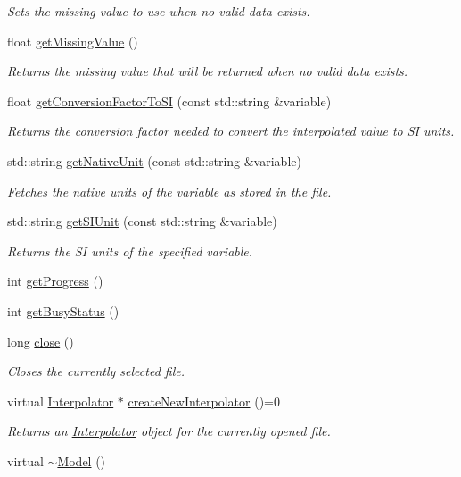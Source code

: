 \begin{DoxyCompactItemize}
\begin{DoxyCompactList}\small\item\em Sets the missing value to use when no valid data exists. \end{DoxyCompactList}\item 
float \hyperlink{classccmc_1_1_model_aaf909e4165fadb7e6676b49b24df5395}{get\-Missing\-Value} ()
\begin{DoxyCompactList}\small\item\em Returns the missing value that will be returned when no valid data exists. \end{DoxyCompactList}\item 
float \hyperlink{classccmc_1_1_model_a360b4e5af01c3e06e6673bcbd3a45866}{get\-Conversion\-Factor\-To\-S\-I} (const std\-::string \&variable)
\begin{DoxyCompactList}\small\item\em Returns the conversion factor needed to convert the interpolated value to S\-I units. \end{DoxyCompactList}\item 
std\-::string \hyperlink{classccmc_1_1_model_adca33e777f077a8b8e8ad0a55b6522a2}{get\-Native\-Unit} (const std\-::string \&variable)
\begin{DoxyCompactList}\small\item\em Fetches the native units of the variable as stored in the file. \end{DoxyCompactList}\item 
std\-::string \hyperlink{classccmc_1_1_model_ad854953817fe933b40bc101ffd585270}{get\-S\-I\-Unit} (const std\-::string \&variable)
\begin{DoxyCompactList}\small\item\em Returns the S\-I units of the specified variable. \end{DoxyCompactList}\item 
int \hyperlink{classccmc_1_1_model_acefd918ab6e100f78db9321e0e9d52d1}{get\-Progress} ()
\item 
int \hyperlink{classccmc_1_1_model_a6447808cc040178db855bede2fbd1e57}{get\-Busy\-Status} ()
\item 
long \hyperlink{classccmc_1_1_model_ac6084cbe35b46be75d8421fd5ca91f23}{close} ()
\begin{DoxyCompactList}\small\item\em Closes the currently selected file. \end{DoxyCompactList}\item 
virtual \hyperlink{classccmc_1_1_interpolator}{Interpolator} $\ast$ \hyperlink{classccmc_1_1_model_a0dd491507c14502c27aa61b020fca8cc}{create\-New\-Interpolator} ()=0
\begin{DoxyCompactList}\small\item\em Returns an \hyperlink{classccmc_1_1_interpolator}{Interpolator} object for the currently opened file. \end{DoxyCompactList}\item 
virtual \hyperlink{classccmc_1_1_model_a477195ac6dd41b02c4f9714d41d83d48}{$\sim$\-Model} ()
\end{DoxyCompactItemize}
